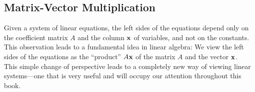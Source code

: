 \subsection*{Matrix-Vector Multiplication}


Given a system of linear equations, the left sides of the equations depend only on the coefficient matrix $A$ and the column $\textbf{x}$ of variables, and not on the constants. This observation leads to a fundamental idea in linear algebra: We view the left sides of the equations as the ``product'' $A\textbf{x}$ of the matrix $A$ and the vector $\textbf{x}$. This simple change of perspective leads to a completely new way of viewing linear systems---one that is very useful and will occupy our attention throughout this book.

